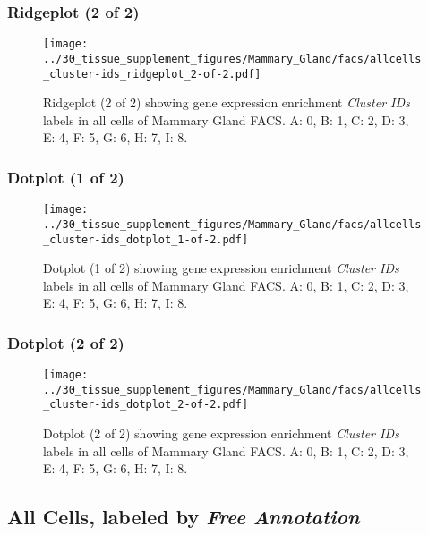 \clearpage

\subsubsection{Ridgeplot (2 of 2)}
\begin{figure}[h]
\centering
\texttt{[image: ../30\_tissue\_supplement\_figures/Mammary\_Gland/facs/allcells\_cluster-ids\_ridgeplot\_2-of-2.pdf]}

\caption{ Ridgeplot (2 of 2)  showing gene expression enrichment \emph{Cluster IDs} labels in all cells of Mammary Gland FACS. A: 0, B: 1, C: 2, D: 3, E: 4, F: 5, G: 6, H: 7, I: 8.}
\end{figure}


\clearpage

\subsubsection{Dotplot (1 of 2)}
\begin{figure}[h]
\centering
\texttt{[image: ../30\_tissue\_supplement\_figures/Mammary\_Gland/facs/allcells\_cluster-ids\_dotplot\_1-of-2.pdf]}

\caption{ Dotplot (1 of 2)  showing gene expression enrichment \emph{Cluster IDs} labels in all cells of Mammary Gland FACS. A: 0, B: 1, C: 2, D: 3, E: 4, F: 5, G: 6, H: 7, I: 8.}
\end{figure}


\clearpage

\subsubsection{Dotplot (2 of 2)}
\begin{figure}[h]
\centering
\texttt{[image: ../30\_tissue\_supplement\_figures/Mammary\_Gland/facs/allcells\_cluster-ids\_dotplot\_2-of-2.pdf]}

\caption{ Dotplot (2 of 2)  showing gene expression enrichment \emph{Cluster IDs} labels in all cells of Mammary Gland FACS. A: 0, B: 1, C: 2, D: 3, E: 4, F: 5, G: 6, H: 7, I: 8.}
\end{figure}


\clearpage

\subsection{All Cells, labeled by \emph{Free Annotation}}
